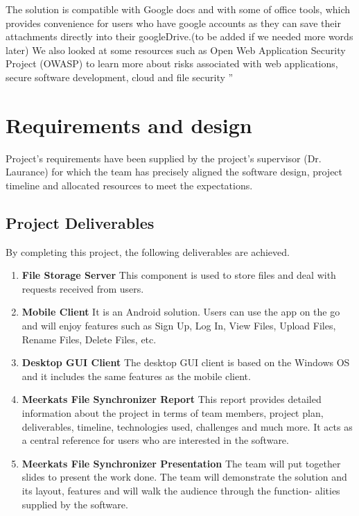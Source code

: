 \documentclass{article}
\begin{document}
The solution is compatible with Google docs and with some of office tools, which provides convenience for users who have google accounts as they can save their attachments directly into their googleDrive.(to be added if we needed more words later)
\newline
\hfill \break
We also looked at some resources such as Open Web Application Security Project (OWASP) to learn more about risks associated with web applications, secure software development, cloud and file security ''


\section{Requirements and design}
Project’s requirements have been supplied by the project’s supervisor (Dr. Laurance) for which the team has precisely aligned the software design, project timeline and allocated resources to meet the expectations.

\subsection{Project Deliverables}
By completing this project, the following deliverables are achieved.
\begin{enumerate}
  \item \textbf{File Storage Server} This component is used to store files and deal with requests received from users.
  \item \textbf{Mobile Client} It is an Android solution. Users can use the app on the go and will enjoy features such as Sign Up, Log In, View Files, Upload Files, Rename Files, Delete Files, etc.
  \item \textbf{Desktop GUI Client} The desktop GUI client is based on the Windows OS and it includes the same features as the mobile client.
  \item \textbf{Meerkats File Synchronizer Report} This report provides detailed information about the project in terms of team members, project plan, deliverables, timeline, technologies used, challenges and much more. It acts as a central reference for users who are interested in the software.
  \item \textbf{Meerkats File Synchronizer Presentation} The team will put together slides to present the work done. The team will demonstrate the solution and its layout, features and will walk the audience through the function- alities supplied by the software.
\end{enumerate}
\end{document}
